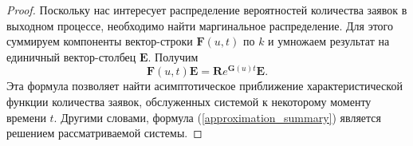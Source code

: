 \begin{proof}
	Поскольку нас интересует распределение вероятностей количества заявок в выходном процессе, необходимо найти маргинальное распределение. Для этого суммируем компоненты вектор-строки $\boldsymbol{F}(u,t)$ по $k$ и умножаем результат на единичный вектор-столбец $\boldsymbol{E}$. Получим
	\begin{equation}\label{approximation_summary}
		\boldsymbol{F}(u,t)\boldsymbol{E}=\boldsymbol{R}e^{\boldsymbol{G}(u)t}\boldsymbol{E}.
	\end{equation}
	Эта формула позволяет найти асимптотическое приближение характеристической функции количества заявок, обслуженных системой к некоторому моменту времени $t$. Другими словами, формула (\ref{approximation_summary}) является решением рассматриваемой системы. 
\end{proof}



